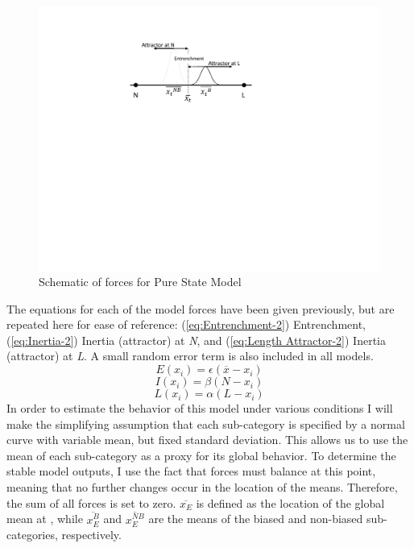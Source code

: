 \begin{figure}[H]
\begin{centering}
\includegraphics[width=.45\textwidth]{figures/Model6Behavior.pdf}\caption{\label{fig:Model G}Schematic of forces for Pure State Model}
\par\end{centering}
\end{figure}

The equations for each of the model forces have been given previously,
but are repeated here for ease of reference: (\ref{eq:Entrenchment-2})
Entrenchment, (\ref{eq:Inertia-2}) Inertia (attractor) at \emph{N},
and (\ref{eq:Length Attractor-2}) Inertia (attractor) at\emph{ L}.
A small random error term is also included in all models. 
\begin{equation}
E(x_{i})=\epsilon(\overline{x}-x_{i})\label{eq:Entrenchment-2}
\end{equation}
\begin{equation}
I(x_{i})=\beta(N-x_{i})\label{eq:Inertia-2}
\end{equation}
\begin{equation}
L(x_{i})=\alpha(L-x_{i})\label{eq:Length Attractor-2}
\end{equation}
In order to estimate the behavior of this model under various conditions
I will make the simplifying assumption that each sub-category is
specified by a normal curve with variable mean, but fixed standard
deviation. This allows us to use the mean of each sub-category as
a proxy for its global behavior. To determine the stable model outputs,
I use the fact that forces must balance at this  point,
meaning that no further changes occur in the location of the means.
Therefore, the sum of all forces is set to zero. $\overline{x_{E}}$
is defined as the location of the global mean at , while
$\overline{x_{E}^{B}}$ and $\overline{x_{E}^{NB}}$ are the 
means of the biased and non-biased sub-categories, respectively. 

